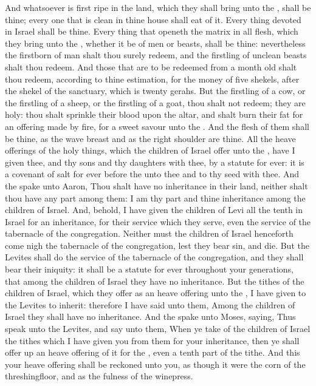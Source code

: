\begin{biblechapter}
\verse And whatsoever is first ripe in the land, which they shall bring unto the \LORD, shall be thine; every one that is clean in thine house shall eat of it.
\verse Every thing devoted in Israel shall be thine.
\verse Every thing that openeth the matrix in all flesh, which they bring unto the \LORD, whether it be of men or beasts, shall be thine: nevertheless the firstborn of man shalt thou surely redeem, and the firstling of unclean beasts shalt thou redeem.
\verse And those that are to be redeemed from a month old shalt thou redeem, according to thine estimation, for the money of five shekels, after the shekel of the sanctuary, which is twenty gerahs.
\verse But the firstling of a cow, or the firstling of a sheep, or the firstling of a goat, thou shalt not redeem; they are holy: thou shalt sprinkle their blood upon the altar, and shalt burn their fat for an offering made by fire, for a sweet savour unto the \LORD.
\verse And the flesh of them shall be thine, as the wave breast and as the right shoulder are thine.
\verse All the heave offerings of the holy things, which the children of Israel offer unto the \LORD, have I given thee, and thy sons and thy daughters with thee, by a statute for ever: it is a covenant of salt for ever before the \LORD unto thee and to thy seed with thee.
\verse And the \LORD spake unto Aaron, Thou shalt have no inheritance in their land, neither shalt thou have any part among them: I am thy part and thine inheritance among the children of Israel.
\verse And, behold, I have given the children of Levi all the tenth in Israel for an inheritance, for their service which they serve, even the service of the tabernacle of the congregation.
\verse Neither must the children of Israel henceforth come nigh the tabernacle of the congregation, lest they bear sin, and die.
\verse But the Levites shall do the service of the tabernacle of the congregation, and they shall bear their iniquity: it shall be a statute for ever throughout your generations, that among the children of Israel they have no inheritance.
\verse But the tithes of the children of Israel, which they offer as an heave offering unto the \LORD, I have given to the Levites to inherit: therefore I have said unto them, Among the children of Israel they shall have no inheritance.
\verse And the \LORD spake unto Moses, saying,
\verse Thus speak unto the Levites, and say unto them, When ye take of the children of Israel the tithes which I have given you from them for your inheritance, then ye shall offer up an heave offering of it for the \LORD, even a tenth part of the tithe.
\verse And this your heave offering shall be reckoned unto you, as though it were the corn of the threshingfloor, and as the fulness of the winepress.

\end{biblechapter}
